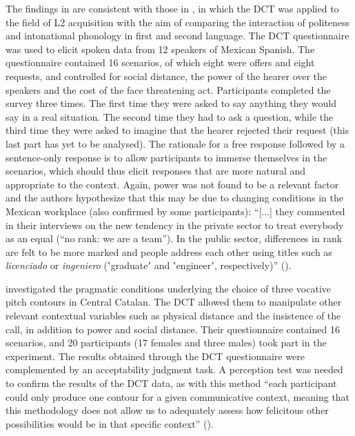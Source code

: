 \documentclass[output=paper]{LSP/langsci}
\begin{document}
The findings in \citet{Astruc2016offers} are consistent with those in \citet{Astruc2016politeness}, in which the DCT was applied to the field of L2 acquisition with the aim of comparing the interaction of politeness and intonational phonology in first and second language. The DCT questionnaire was used to elicit spoken data from 12 speakers of Mexican Spanish. The questionnaire contained 16 scenarios, of which eight were offers and eight requests, and controlled for social distance, the power of the hearer over the speakers and the cost of the face threatening act. Participants completed the survey three times. The first time they were asked to say anything they would say in a real situation. The second time they had to ask a question, while the third time they were asked to imagine that the hearer rejected their request (this last part has yet to be analysed). The rationale for a free response followed by a sentence-only response is to allow participants to immerse themselves in the scenarios, which should thus elicit responses that are more natural and appropriate to the context. Again, power was not found to be a relevant factor and the authors hypothesize that this may be due to changing conditions in the Mexican workplace (also confirmed by some participants): “[...] they commented in their interviews on the new tendency in the private sector to treat everybody as an equal (“no rank: we are a team”). In the public sector, differences in rank are felt to be more marked and people address each other using titles such as \textit{licenciado} or \textit{ingeniero} (ʽgraduateʼ and ʽengineerʼ, respectively)” (\citealt[22]{Astruc2016offers}). 

\citet{Borras-Comes2015} investigated the pragmatic conditions underlying the choice of three vocative pitch contours in Central Catalan. The DCT allowed them to manipulate other relevant contextual variables such as physical distance and the insistence of the call, in addition to power and social distance. Their questionnaire contained 16 scenarios, and 20 participants (17 females and three males) took part in the experiment. The results obtained through the DCT questionnaire were complemented by an acceptability judgment task. A perception test was needed to confirm the results of the DCT data, as with this method “each participant could only produce one contour for a given communicative context, meaning that this methodology does not allow us to adequately assess how felicitous other possibilities would be in that specific context” (\citealt[74--75]{Borras-Comes2015}).\largerpage[-1]
\end{document}
